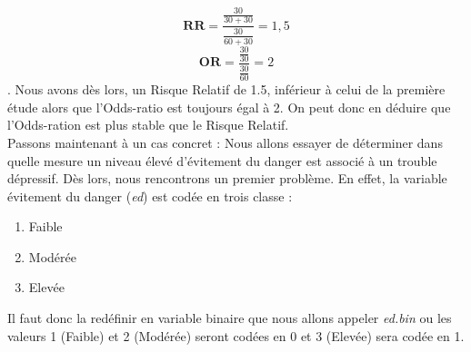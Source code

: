 $$\mathbf{\textrm{RR}} = \frac{\frac{30}{30+30}}{\frac{30}{60+30}} = 1,5$$
$$\mathbf{\textrm{OR}} = \frac{\frac{30}{30}}{\frac{30}{60}}=2$$.
Nous avons dès lors, un Risque Relatif de 1.5, inférieur à celui de la première étude alors que l'Odds-ratio est toujours égal à 2.\newline
On peut donc en déduire que l'Odds-ration est plus stable que le Risque Relatif.\newline
\\
Passons maintenant à un cas concret : Nous allons essayer de déterminer dans quelle mesure un niveau élevé d'évitement du danger est associé à un trouble dépressif.\newline
Dès lors, nous rencontrons un premier problème. En effet, la variable évitement du danger (\textit{ed}) est codée en trois classe : 
\begin{enumerate}
\item Faible 
\item Modérée 
\item Elevée
\end{enumerate}
Il faut donc la redéfinir en variable binaire que nous allons appeler \textit{ed.bin} ou les valeurs 1 (Faible) et 2 (Modérée) seront codées en 0 et 3 (Elevée) sera codée en 1.
